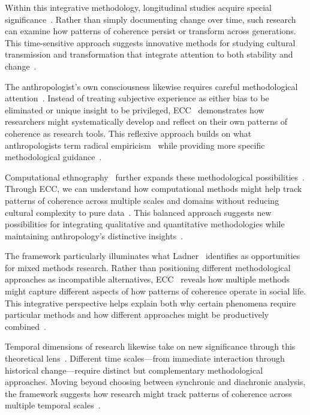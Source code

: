 Within this integrative methodology, longitudinal studies acquire special significance~\cite{strathern2004partial, strathern1992after}. Rather than simply documenting change over time, such research can examine how patterns of coherence persist or transform across generations. This time-sensitive approach suggests innovative methods for studying cultural transmission and transformation that integrate attention to both stability and change~\cite{toren1999mind}.

The anthropologist's own consciousness likewise requires careful methodological attention~\cite{rabinow2011accompaniment, jackson1989paths}. Instead of treating subjective experience as either bias to be eliminated or unique insight to be privileged, ECC~ demonstrates how researchers might systematically develop and reflect on their own patterns of coherence as research tools. This reflexive approach builds on what anthropologists term radical empiricism~ while providing more specific methodological guidance~\cite{jackson1996things}.

Computational ethnography~ further expands these methodological possibilities~\cite{beaulieu2017vectors}. Through ECC, we can understand how computational methods might help track patterns of coherence across multiple scales and domains without reducing cultural complexity to pure data~\cite{boyer2015digital}. This balanced approach suggests new possibilities for integrating qualitative and quantitative methodologies while maintaining anthropology's distinctive insights~\cite{dourish2011divining}.

The framework particularly illuminates what Ladner~\cite{ladner2019mixed} identifies as opportunities for mixed methods research. Rather than positioning different methodological approaches as incompatible alternatives, ECC~ reveals how multiple methods might capture different aspects of how patterns of coherence operate in social life. This integrative perspective helps explain both why certain phenomena require particular methods and how different approaches might be productively combined~\cite{garforth2012invisibilities}.

Temporal dimensions of research likewise take on new significance through this theoretical lens~\cite{marcus2012multi, rabinow2008marking}. Different time scales---from immediate interaction through historical change---require distinct but complementary methodological approaches. Moving beyond choosing between synchronic and diachronic analysis, the framework suggests how research might track patterns of coherence across multiple temporal scales~\cite{steward1972theory}.

